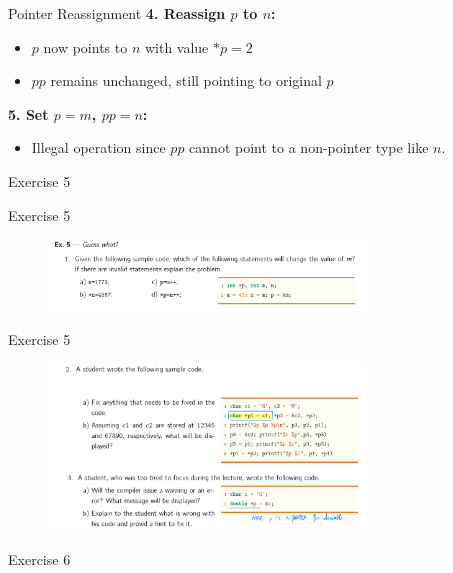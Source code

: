 \documentclass[
	11pt, %
]{beamer}
\begin{document}
\begin{frame}{Pointer Reassignment}
    \textbf{4. Reassign \( p \) to \( n \):}
    \begin{itemize}
        \item \( p \) now points to \( n \) with value \( *p = 2 \)
        \item \( pp \) remains unchanged, still pointing to original \( p \)
    \end{itemize}
    
    \textbf{5. Set \( p = m \), \( pp = n \):}
    \begin{itemize}
        \item Illegal operation since \( pp \) cannot point to a non-pointer type like \( n \).
    \end{itemize}
\end{frame}

\begin{frame}{Exercise 5}
    
	
\end{frame}


\begin{frame}{Exercise 5}
	\begin{figure}
		\includegraphics[width=0.75\textwidth]{ex5_0.png}
	\end{figure}
	
\end{frame}

\begin{frame}{Exercise 5}
    \begin{figure}
		\includegraphics[width=0.75\textwidth]{ex5.png}
	\end{figure}
\end{frame}

\begin{frame}{Exercise 6}
    
\end{frame}
\end{document}
